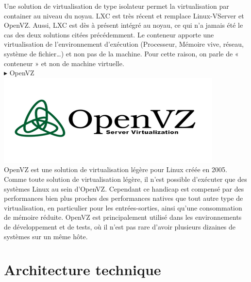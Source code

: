 \documentclass[a4paper, 12pt]{report}
\begin{document}
Une solution de virtualisation de type isolateur permet la virtualisation par container au niveau du noyau. LXC est très récent et remplace Linux-VServer et OpenVZ.  Aussi, LXC est dès à présent intégré au noyau, ce qui n’a jamais été le cas des deux solutions citées précédemment.
Le conteneur apporte une virtualisation de l’environnement d’exécution (Processeur, Mémoire vive, réseau, système de fichier…) et non pas de la machine. Pour cette raison, on parle de « conteneur » et non de machine virtuelle.
\\
\noindent $\blacktriangleright$ OpenVZ
\\ 
\includegraphics{img/outils/13}
\\
\noindent OpenVZ est une solution de virtualisation légère pour Linux créée en 2005.
Comme toute solution de virtualisation légère, il n'est possible d'exécuter que des systèmes Linux au sein d'OpenVZ. Cependant ce handicap est compensé par des performances bien plus proches des performances natives que tout autre type de virtualisation, en particulier pour les entrées-sorties, ainsi qu'une consommation de mémoire réduite. OpenVZ est principalement utilisé dans les environnements de développement et de tests, où il n'est pas rare d'avoir plusieurs dizaines de systèmes sur un même hôte.

\section{Architecture technique}
\end{document}
